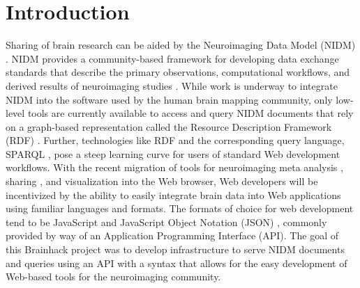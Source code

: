\documentclass[twocolumn]{bmcart}%
\begin{document}
\section{Introduction}\label{introduction}
Sharing of brain research can be aided by the Neuroimaging Data Model (NIDM) \cite{Keator2013-rc,noauthor_undated-jz,noauthor_undated-pr}. NIDM provides a community-based framework for developing data exchange standards that describe the primary observations, computational workflows, and derived results of neuroimaging studies \cite{noauthor_undated-jv}. While work is underway to integrate NIDM into the software used by the human brain mapping community, only low-level tools are currently available to access and query NIDM documents that rely on a graph-based representation called the Resource Description Framework (RDF) \cite{noauthor_undated-hj}. Further, technologies like RDF and the corresponding query language, SPARQL \cite{noauthor_undated-cp}, pose a steep learning curve for users of standard Web development workflows. With the recent migration of tools for neuroimaging meta analysis \cite{Yarkoni2011-rg,Reid2015-gt}, sharing \cite{Crawford2016-zl,Landis2016-wo,Book2016-ro,Herrick2016-bw,Hodge2016-ht,Jernigan2016-dz,Kini2016-sg,Wang2016-nd,Gorgolewski2015-sf}, and visualization \cite{Gutman2014-hz,Gao2015-pz,noauthor_undated-ca} into the Web browser, Web developers will be incentivized by the ability to easily integrate brain data into Web applications using familiar languages and formats. The formats of choice for web development tend to be JavaScript and JavaScript Object Notation (JSON) \cite{Wikipedia_contributors2015-on,noauthor_undated-tz}, commonly provided by way of an Application Programming Interface (API). The goal of this Brainhack project was to develop infrastructure to serve NIDM documents and queries using an API with a syntax that allows for the easy development of Web-based tools for the neuroimaging community.
\end{document}
